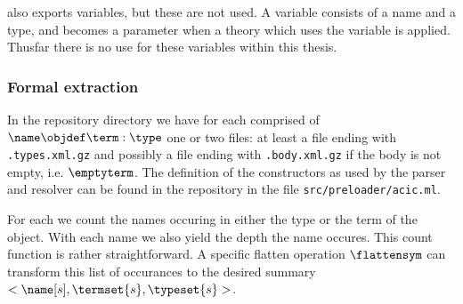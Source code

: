 \coq also exports variables, but these are not used.
A variable consists of a name and a type, and becomes a parameter when a theory which uses the variable is applied.
Thusfar there is no use for these variables within this thesis.

\subsubsection{Formal extraction}
In the repository \xml directory we have for each \coqobj[s] comprised of $\name \objdef \term : \type$
one or two files: at least a file ending with \lstinline{.types.xml.gz} and
possibly a file ending with \lstinline{.body.xml.gz} if the body is not empty, i.e. $\emptyterm$.
The definition of the constructors as used by the parser and resolver can be found
in the \roerei repository in the file \lstinline{src/preloader/acic.ml}.

For each \coqobj[s] we count the names occuring in either the type or the term of the object.
With each name we also yield the depth the name occures.
This count function is rather straightforward.
A specific flatten operation $\flattensym$ can transform this list of occurances to the desired summary $<\name[s], \termset{s}, \typeset{s}>$.

